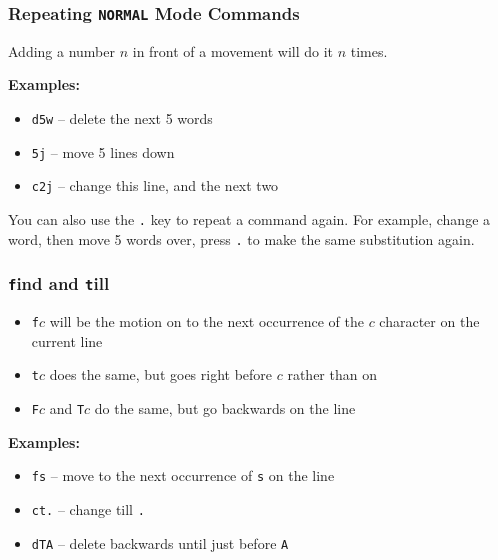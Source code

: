 \documentclass{lug}
\begin{document}
\begin{frame}
    \frametitle{Repeating \texttt{NORMAL} Mode Commands}
    Adding a number $n$ in front of a movement will do it $n$ times.

    \medskip
    \textbf{Examples:}

    \begin{itemize}
        \item \texttt{d5w} -- delete the next 5 words
        \item \texttt{5j} -- move 5 lines down
        \item \texttt{c2j} -- change this line, and the next two
    \end{itemize}

    \bigskip

    You can also use the \texttt{.} key to repeat a command again. For example,
    change a word, then move 5 words over, press \texttt{.} to make the same
    substitution again.
\end{frame}

\begin{frame}
    \frametitle{\texttt{f}ind and \texttt{t}ill}

    \begin{itemize}
        \item \texttt{f$c$} will be the motion on to the next occurrence of the
            $c$ character on the current line
        \item \texttt{t$c$} does the same, but goes right before $c$ rather
            than on
        \item \texttt{F$c$} and \texttt{T$c$} do the same, but go backwards on
            the line
    \end{itemize}

    \medskip
    \textbf{Examples:}

    \begin{itemize}
        \item \texttt{fs} -- move to the next occurrence of \texttt{s} on the
            line
        \item \texttt{ct.} -- change till \texttt{.}
        \item \texttt{dTA} -- delete backwards until just before \texttt{A}
    \end{itemize}
\end{frame}
\end{document}
